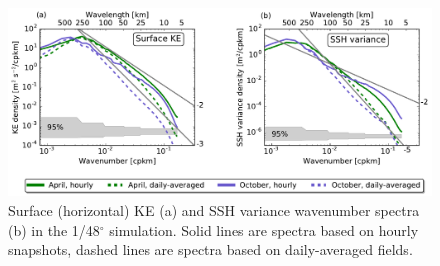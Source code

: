 \documentclass[grl]{agutex2015}
\begin{document}
\begin{article}
\begin{figure}[ht]
  \begin{center}
    \includegraphics[width=.75\textwidth]{figs/fig4.pdf}
 \caption{Surface (horizontal) KE (a) and SSH variance wavenumber spectra (b)
 in the 1/48$^\circ$ simulation. Solid lines
 are spectra based on hourly snapshots, dashed lines are spectra based on daily-averaged
 fields.}
 \label{fig4}
 \end{center}
\end{figure}


%
%
%




\end{article}
\end{document}
